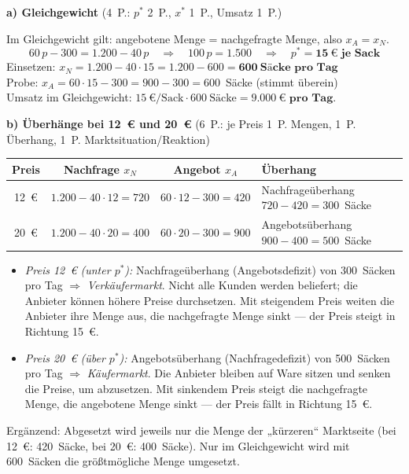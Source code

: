 \begin{loesung}[title={Lösung Aufgabe~1.4 --- Marktgleichgewicht aus Angebots- und Nachfragefunktion}]
\textbf{a) Gleichgewicht} \hfill (4~P.: $p^*$ 2~P., $x^*$ 1~P., Umsatz 1~P.)

Im Gleichgewicht gilt: angebotene Menge = nachgefragte Menge, also $x_A = x_N$.
\[
60\,p - 300 = 1.200 - 40\,p
\quad\Rightarrow\quad 100\,p = 1.500
\quad\Rightarrow\quad p^* = \mathbf{15~\text{€ je Sack}}
\]
Einsetzen: $x_N = 1.200 - 40 \cdot 15 = 1.200 - 600 = \mathbf{600~\text{Säcke pro Tag}}$\\
Probe: $x_A = 60 \cdot 15 - 300 = 900 - 300 = 600$~Säcke (stimmt überein)\\
Umsatz im Gleichgewicht: $15~\text{€/Sack} \cdot 600~\text{Säcke} = \mathbf{9.000~\text{€ pro Tag}}$.

\textbf{b) Überhänge bei 12~€ und 20~€} \hfill (6~P.: je Preis 1~P. Mengen, 1~P. Überhang,
1~P. Marktsituation/Reaktion)

\begin{center}
\small
\begin{tabular}{c c c l}
\toprule
\rowcolor{bfwTabHead}
\textbf{Preis} & \textbf{Nachfrage $x_N$} & \textbf{Angebot $x_A$} & \textbf{Überhang}\\
\midrule
12~€ & $1.200 - 40 \cdot 12 = 720$ & $60 \cdot 12 - 300 = 420$ & Nachfrageüberhang $720 - 420 = 300$~Säcke\\
20~€ & $1.200 - 40 \cdot 20 = 400$ & $60 \cdot 20 - 300 = 900$ & Angebotsüberhang $900 - 400 = 500$~Säcke\\
\bottomrule
\end{tabular}
\end{center}
\begin{itemize}
  \item \emph{Preis 12~€ (unter $p^*$):} Nachfrageüberhang (Angebotsdefizit) von
    300~Säcken pro Tag $\Rightarrow$ \emph{Verkäufermarkt}. Nicht alle Kunden werden
    beliefert; die Anbieter können höhere Preise durchsetzen. Mit steigendem Preis
    weiten die Anbieter ihre Menge aus, die nachgefragte Menge sinkt --- der Preis
    steigt in Richtung 15~€.
  \item \emph{Preis 20~€ (über $p^*$):} Angebotsüberhang (Nachfragedefizit) von
    500~Säcken pro Tag $\Rightarrow$ \emph{Käufermarkt}. Die Anbieter bleiben auf Ware
    sitzen und senken die Preise, um abzusetzen. Mit sinkendem Preis steigt die
    nachgefragte Menge, die angebotene Menge sinkt --- der Preis fällt in Richtung 15~€.
\end{itemize}
Ergänzend: Abgesetzt wird jeweils nur die Menge der „kürzeren`` Marktseite (bei 12~€:
420~Säcke, bei 20~€: 400~Säcke). Nur im Gleichgewicht wird mit 600~Säcken die größtmögliche
Menge umgesetzt.


\end{loesung}

